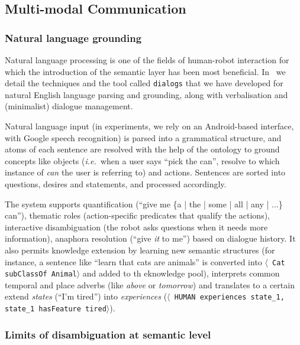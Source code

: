 \documentclass[preprint,5p]{elsarticle}
\newcommand{\stmt}[1]{{\footnotesize \tt $\langle$ #1\relax$\rangle$}}
\newcommand{\ie}{{\textit{i.e.\ }}}
\begin{document}
\subsection{Multi-modal Communication}
\label{sect|com}

\subsubsection{Natural language grounding}

Natural language processing is one of the fields of human-robot interaction
for which the introduction of the semantic layer has been most beneficial.
In~\cite{Lemaignan2011a} we detail the techniques and the tool called
\texttt{dialogs} that we have developed for natural English language parsing and
grounding, along with verbalisation and (minimalist) dialogue management.

Natural language input (in experiments, we rely on an Android-based interface,
with Google speech recognition) is parsed into a grammatical structure, and
atoms of each sentence are resolved with the help of the ontology to ground
concepts like objects (\ie when a user says ``pick the can'', resolve to which
instance of \emph{can} the user is referring to) and actions. Sentences are
sorted into questions, desires and statements, and processed accordingly.

The system supports quantification (``give me \{a | the | some | all | any |
...\} can''), thematic roles (action-specific predicates that qualify the
actions), interactive disambiguation (the robot asks questions when it needs
more information), anaphora resolution (``give \emph{it} to me'') based on
dialogue history. It also permits knowledge extension by learning new semantic
structures (for instance, a sentence like ``learn that cats are animals'' is
converted into \stmt{Cat subClassOf Animal} and added to th eknowledge pool),
interprets common temporal and place adverbs (like \emph{above} or
\emph{tomorrow}) and translates to a certain extend \emph{states} (``I'm
tired'') into \emph{experiences} (\stmt{HUMAN experiences state\_1, state\_1
hasFeature tired}).


\subsubsection{Limits of disambiguation at semantic level}
\end{document}
